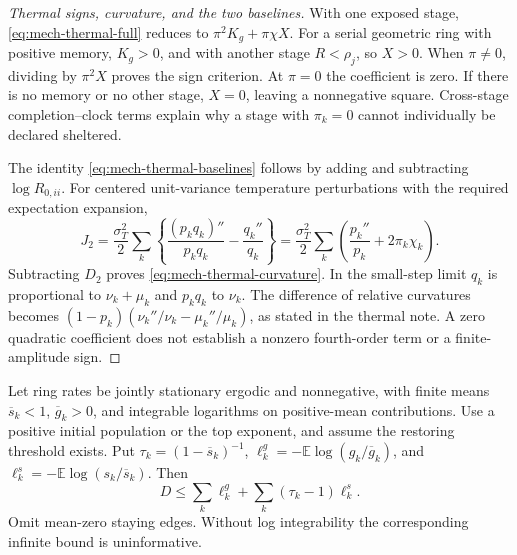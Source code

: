 \begin{proof}[Thermal signs, curvature, and the two baselines]
With one exposed stage, \eqref{eq:mech-thermal-full} reduces to \(\pi^2K_g+\pi\chi X\). For a serial geometric ring with positive memory, \(K_g>0\), and with another stage \(R<\rho_j\), so \(X>0\). When \(\pi\ne0\), dividing by \(\pi^2X\) proves the sign criterion. At \(\pi=0\) the coefficient is zero. If there is no memory or no other stage, \(X=0\), leaving a nonnegative square. Cross-stage completion--clock terms explain why a stage with \(\pi_k=0\) cannot individually be declared sheltered.

The identity \eqref{eq:mech-thermal-baselines} follows by adding and subtracting \(\log R_{0,ii}\). For centered unit-variance temperature perturbations with the required expectation expansion,
\[
 J_2=\frac{\sigma_T^2}{2}\sum_k
 \left\{\frac{(p_kq_k)''}{p_kq_k}-\frac{q_k''}{q_k}\right\}
 =\frac{\sigma_T^2}{2}\sum_k\left(\frac{p_k''}{p_k}+2\pi_k\chi_k\right).
\]
Subtracting \(D_2\) proves \eqref{eq:mech-thermal-curvature}. In the small-step limit \(q_k\) is proportional to \(\nu_k+\mu_k\) and \(p_kq_k\) to \(\nu_k\). The difference of relative curvatures becomes
\((1-p_k)(\nu_k''/\nu_k-\mu_k''/\mu_k)\), as stated in the thermal note. A zero quadratic coefficient does not establish a nonzero fourth-order term or a finite-amplitude sign.
\end{proof}

\begin{proposition}\label{prop:mech-edge-bound}
Let ring rates be jointly stationary ergodic and nonnegative, with finite means \(\overline s_k<1\), \(\overline g_k>0\), and integrable logarithms on positive-mean contributions. Use a positive initial population or the top exponent, and assume the restoring threshold exists. Put \(\tau_k=(1-\overline s_k)^{-1}\), \(\ell_k^g=-\mathbb E\log(g_k/\overline g_k)\), and \(\ell_k^s=-\mathbb E\log(s_k/\overline s_k)\). Then
\begin{equation}\label{eq:mech-edge-bound}
 D\leq\sum_k\ell_k^g+\sum_k(\tau_k-1)\ell_k^s.
\end{equation}
Omit mean-zero staying edges. Without log integrability the corresponding infinite bound is uninformative.
\end{proposition}

